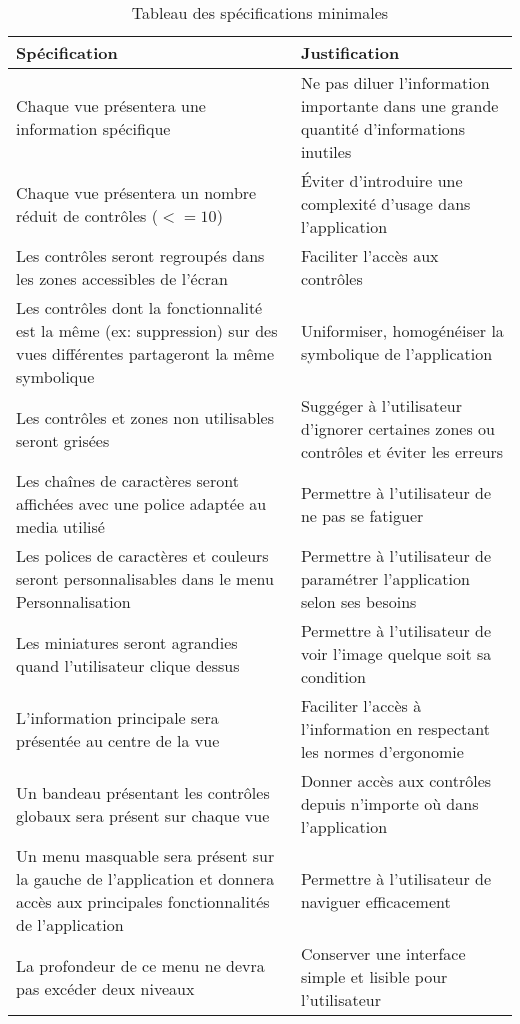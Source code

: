 \begin{table}[H]
    \centering
    \caption{Tableau des spécifications minimales}
    \label{min-spec-table}
    \begin{tabular}{p{8cm}|p{8cm}}
        \bf{Spécification} & \bf{Justification} \\ \hline
        Chaque vue présentera une information spécifique & Ne pas diluer l'information importante dans une grande quantité d'informations inutiles \\ \hline
        Chaque vue présentera un nombre réduit de contrôles ($<= 10$) & \'Eviter d'introduire une complexité d'usage dans l'application \\ \hline
        Les contrôles seront regroupés dans les zones accessibles de l'écran &  Faciliter l'accès aux contrôles \\ \hline
        Les contrôles dont la fonctionnalité est la même (ex: suppression) sur des vues différentes partageront la même symbolique & Uniformiser, homogénéiser la symbolique de l'application \\ \hline
        Les contrôles et zones non utilisables seront grisées & Suggéger à l'utilisateur d'ignorer certaines zones ou contrôles et éviter les erreurs \\ \hline
        Les chaînes de caractères seront affichées avec une police adaptée au media utilisé & Permettre à l'utilisateur de ne pas se fatiguer \\ \hline
        Les polices de caractères et couleurs seront personnalisables dans le menu \og{}Personnalisation\fg{} & Permettre à l'utilisateur de paramétrer l'application selon ses besoins \\ \hline
        Les miniatures seront agrandies quand l'utilisateur clique dessus & Permettre à l'utilisateur de voir l'image quelque soit sa condition \\ \hline
        L'information principale sera présentée au centre de la vue & Faciliter l'accès à l'information en respectant les normes d'ergonomie \\ \hline
        Un bandeau présentant les contrôles globaux sera présent sur chaque vue & Donner accès aux contrôles depuis n'importe où dans l'application \\ \hline
        Un menu masquable sera présent sur la gauche de l'application et donnera accès aux principales fonctionnalités de l'application & Permettre à l'utilisateur de naviguer efficacement \\ \hline
        La profondeur de ce menu ne devra pas excéder deux niveaux & Conserver une interface simple et lisible pour l'utilisateur \\ \hline 

\end{tabular}
\end{table}
